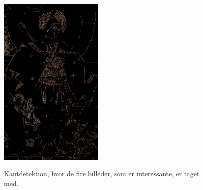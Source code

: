 \begin{figure}[!h]
{        \includegraphics[angle=0,width=0.45\textwidth]{afsnit/afprovning/billeder/thressholds/krafitige_farver/krafite_detalier/2_iteration/300-800.png}
        \label{300-800}}\hspace{1em}
        \caption[]{Kantdetektion, hvor de fire billeder, som er
		interessante, er taget med.}
     \label{allesammen3}
\end{figure}
 
